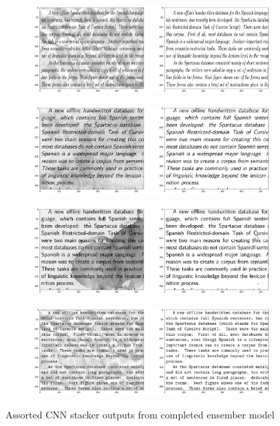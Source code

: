\documentclass[10pt,twocolumn,letterpaper]{article}
\begin{document}
\begin{figure}[h]
    \centering
    \begin{subfigure}[b]{\columnwidth}
        \includegraphics[width=\columnwidth]{images/stacker1.png}
    \end{subfigure}
    \begin{subfigure}[b]{\columnwidth}
        \includegraphics[width=\columnwidth]{images/stacker2.png}
    \end{subfigure}
    \begin{subfigure}[b]{\columnwidth}
        \includegraphics[width=\columnwidth]{images/stacker3.png}
    \end{subfigure}
    \begin{subfigure}[b]{\columnwidth}
        \includegraphics[width=\columnwidth]{images/stacker4.png}
    \end{subfigure}
    \caption{Assorted CNN stacker outputs from completed ensember model}
    \label{fig:stacker_out}
\end{figure}
\end{document}
